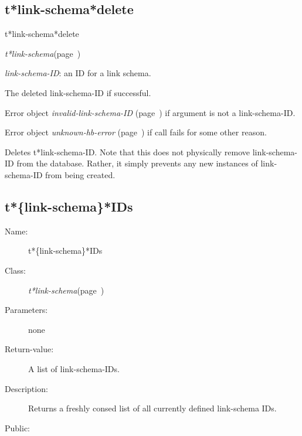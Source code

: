 \subsection{t*link-schema*delete}
\label{t*link-schema*delete}

\begin{description}
\item [Name:]  t*link-schema*delete

\item [Class:] {\sl t*link-schema}\hfill(page~\pageref{t*link-schema})

\item [Parameters:]
\item {\sl link-schema-ID}:  an ID for a link schema.


\item [Return-value:]
The deleted link-schema-ID if successful.

Error object {\sl invalid-link-schema-ID} (page~\pageref{invalid-link-schema-ID}) if argument
is not a link-schema-ID.

Error object {\sl unknown-hb-error} (page~\pageref{unknown-hb-error}) if call fails
for some other reason.

\item [Description:]

Deletes t*link-schema-ID.  Note that this does not
physically remove link-schema-ID from the database.
Rather, it simply prevents any new instances of 
link-schema-ID from being created.

\item [Public:]



\end{description}
\horizontalline

\subsection{t*\{link-schema\}*IDs}
\label{t*link-schema*IDs}

\begin{description}
\item [Name:]  t*\{link-schema\}*IDs

\item [Class:] {\sl t*link-schema}\hfill(page~\pageref{t*link-schema})

\item [Parameters:] none

\item [Return-value:]

A list of link-schema-IDs.

\item [Description:]

Returns a freshly consed list of all currently 
defined link-schema IDs.

\item [Public:]



\end{description}
\horizontalline

